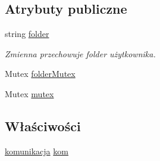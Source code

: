 \subsection*{Atrybuty publiczne}
\begin{CompactItemize}
\item 
string \hyperlink{a00037_e91fc8825b76e32fee5742c3454aaee0}{folder}
\begin{CompactList}\small\item\em Zmienna przechowuje folder użytkownika. \item\end{CompactList}\item 
Mutex \hyperlink{a00037_1ff0a9cb09ec0877a4411793dc5683f7}{folderMutex}
\item 
Mutex \hyperlink{a00037_92cb338fa86bdf0e8f952202ffa362ca}{mutex}
\end{CompactItemize}
\subsection*{Właściwości}
\begin{CompactItemize}
\item 
\hyperlink{a00013}{komunikacja} \hyperlink{a00037_a13c5d1237dd3ac1519ea0225757fce5}{kom}
\end{CompactItemize}

